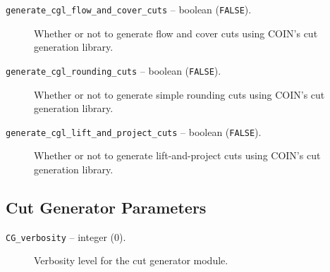 \begin{description}
\item[{\tt generate\_cgl\_flow\_and\_cover\_cuts} -- boolean ({\tt FALSE}).]
Whether or not to generate flow and cover cuts using COIN's cut generation 
library. 

\item[{\tt generate\_cgl\_rounding\_cuts} -- boolean ({\tt FALSE}).]
Whether or not to generate simple rounding cuts using COIN's cut generation 
library. 

\item[{\tt generate\_cgl\_lift\_and\_project\_cuts} -- boolean ({\tt FALSE}).]
Whether or not to generate lift-and-project cuts using COIN's cut generation 
library. 

\end{description}
\subsection{Cut Generator Parameters}

\begin{description}

\item[{\tt CG\_verbosity} -- integer (0).]
Verbosity level for the cut generator module.

\end{description}

